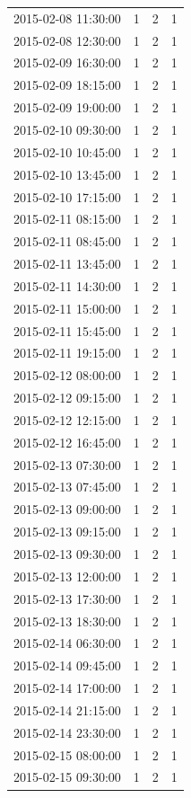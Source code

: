 \begin{tabular}{lrrr}
2015-02-08 11:30:00 & 1 & 2 & 1 \\
2015-02-08 12:30:00 & 1 & 2 & 1 \\
2015-02-09 16:30:00 & 1 & 2 & 1 \\
2015-02-09 18:15:00 & 1 & 2 & 1 \\
2015-02-09 19:00:00 & 1 & 2 & 1 \\
2015-02-10 09:30:00 & 1 & 2 & 1 \\
2015-02-10 10:45:00 & 1 & 2 & 1 \\
2015-02-10 13:45:00 & 1 & 2 & 1 \\
2015-02-10 17:15:00 & 1 & 2 & 1 \\
2015-02-11 08:15:00 & 1 & 2 & 1 \\
2015-02-11 08:45:00 & 1 & 2 & 1 \\
2015-02-11 13:45:00 & 1 & 2 & 1 \\
2015-02-11 14:30:00 & 1 & 2 & 1 \\
2015-02-11 15:00:00 & 1 & 2 & 1 \\
2015-02-11 15:45:00 & 1 & 2 & 1 \\
2015-02-11 19:15:00 & 1 & 2 & 1 \\
2015-02-12 08:00:00 & 1 & 2 & 1 \\
2015-02-12 09:15:00 & 1 & 2 & 1 \\
2015-02-12 12:15:00 & 1 & 2 & 1 \\
2015-02-12 16:45:00 & 1 & 2 & 1 \\
2015-02-13 07:30:00 & 1 & 2 & 1 \\
2015-02-13 07:45:00 & 1 & 2 & 1 \\
2015-02-13 09:00:00 & 1 & 2 & 1 \\
2015-02-13 09:15:00 & 1 & 2 & 1 \\
2015-02-13 09:30:00 & 1 & 2 & 1 \\
2015-02-13 12:00:00 & 1 & 2 & 1 \\
2015-02-13 17:30:00 & 1 & 2 & 1 \\
2015-02-13 18:30:00 & 1 & 2 & 1 \\
2015-02-14 06:30:00 & 1 & 2 & 1 \\
2015-02-14 09:45:00 & 1 & 2 & 1 \\
2015-02-14 17:00:00 & 1 & 2 & 1 \\
2015-02-14 21:15:00 & 1 & 2 & 1 \\
2015-02-14 23:30:00 & 1 & 2 & 1 \\
2015-02-15 08:00:00 & 1 & 2 & 1 \\
2015-02-15 09:30:00 & 1 & 2 & 1 \\

\end{tabular}
